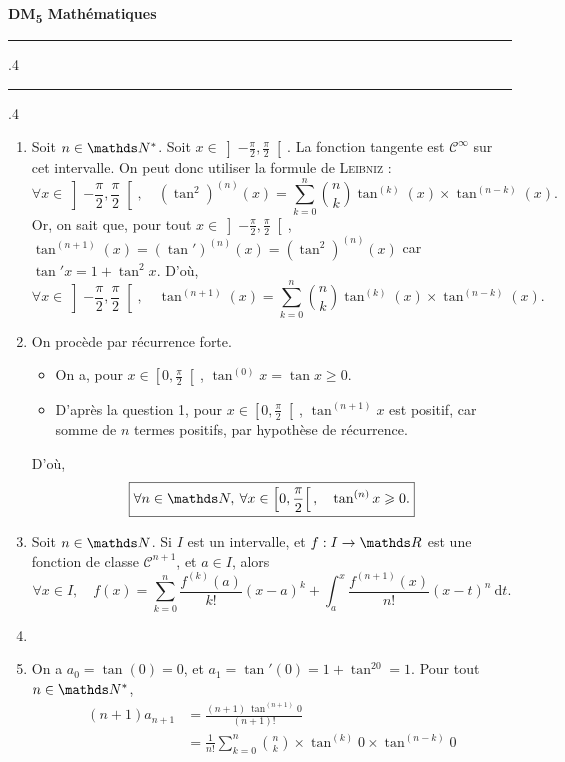\documentclass[a4paper]{article}
\makeatletter
\newcommand*\longline[1][.4\p@]{%
	\leavevmode
	\leaders \hrule \@height #1\relax \hfill
	\null
}
\makeatother
\begin{document}
	\begin{center}
		\bfseries
		\Huge \textbf{DM\textsubscript5 Mathématiques}
	\end{center}

	{ \noindent
		\longline\quad
		\quad\longline
	}

	\begin{enumerate}
		\item Soit $n \in \N^*$. Soit $x \in \left]-\frac{\pi}{2}, \frac{\pi}{2} \right[$.
			La fonction tangente est $\mathcal{C}^\infty$ sur cet intervalle.
			On peut donc utiliser la formule de \textsc{Leibniz} : \[
				\forall x \in \left]-\frac{\pi}{2}, \frac{\pi}{2} \right[,\quad
				(\tan^2)^{(n)}(x) = \sum_{k=0}^n {n\choose k} \tan^{(k)}(x) \times \tan^{(n-k)}(x)
			.\]
			Or, on sait que, pour tout $x \in \left]-\frac{\pi}{2}, \frac{\pi}{2} \right[$, $\tan^{(n+1)}(x) = (\tan')^{(n)}(x) = (\tan^2)^{(n)}(x)$\/ car $\tan'x = 1 + \tan^2 x$.
			D'où, \[
				\boxed{\forall x \in \left]-\frac{\pi}{2}, \frac{\pi}{2} \right[,\quad
				\tan^{(n+1)}(x) = \sum_{k=0}^n {n\choose k} \tan^{(k)}(x) \times \tan^{(n-k)}(x).}
			\]
		\item On procède par récurrence forte.
			\begin{itemize}
				\item On a, pour $x \in \left[0, \frac{\pi}{2}\right[$, $\tan^{(0)} x = \tan x \ge 0$.
				\item D'après la question 1, pour $x \in \left[0, \frac{\pi}{2} \right[$, $\tan^{(n+1)} x$\/ est positif, car somme de $n$\/ termes positifs, par hypothèse de récurrence.
			\end{itemize}
			D'où, \[
				\boxed{\forall n \in \N,\:\forall x \in \left[0,\frac{\pi}{2} \right[,\quad \tan^{(n)} x \ge 0.}
			\]
		\item Soit $n \in \N$. Si $I$\/ est un intervalle, et $f : I \to \R$\/ est une fonction de classe $\mathcal{C}^{n+1}$, et $a \in I$, alors \[
				\boxed{\forall x \in I,\quad f(x) = \sum_{k=0}^n \frac{f^{(k)}(a)}{k!}(x-a)^k + \int_{a}^{x} \frac{f^{(n+1)}(x)}{n!}(x-t)^n~\mathrm{d}t.}
			\]
		\item
		\item On a $a_0 = \tan(0) = 0$, et $a_1 = \tan'(0) = 1+\tan^20 = 1$.
			Pour tout $n \in \N^*$,
			\begin{align*}
				(n+1) a_{n+1} &= \frac{(n+1)\: \tan^{(n+1)} 0}{(n+1)!}\\
				&= \frac{1}{n!} \sum_{k=0}^n {n\choose k} \times  \tan^{(k)}0 \times \tan^{(n-k)} 0 \\

\end{align*}
\end{enumerate}
\end{document}
